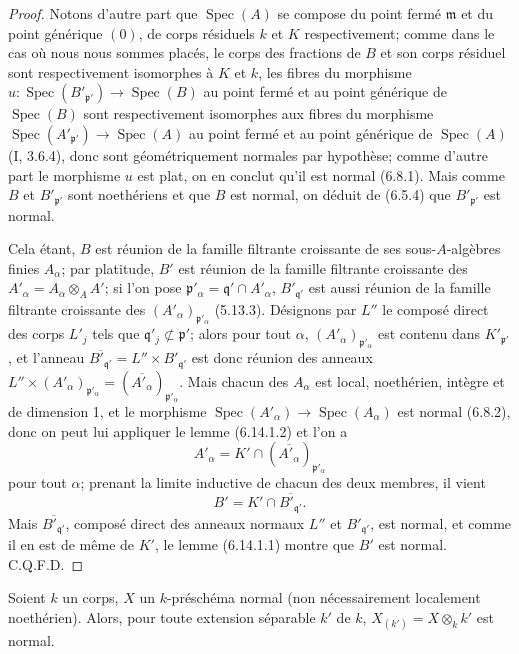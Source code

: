 \begin{proof}
Notons d'autre part que $\operatorname{Spec}(A)$ se compose du point fermé
$\mathfrak m$ et du point générique $(0)$, de corps résiduels $k$ et $K$
respectivement; comme dans le cas où nous nous sommes placés, le corps des
fractions de $B$ et son corps résiduel sont respectivement isomorphes à $K$
et $k$, les fibres du morphisme
$u:\operatorname{Spec}(B'_{\mathfrak p'})\to\operatorname{Spec}(B)$ au
point fermé et au point générique de $\operatorname{Spec}(B)$ sont
respectivement isomorphes aux fibres du morphisme
$\operatorname{Spec}(A'_{\mathfrak p'})\to\operatorname{Spec}(A)$ au point
fermé et au point générique de $\operatorname{Spec}(A)$ (I, 3.6.4), donc
sont géométriquement normales par hypothèse; comme d'autre part le
morphisme $u$ est plat, on en conclut qu'il est normal (6.8.1). Mais comme
$B$ et $B'_{\mathfrak p'}$ sont noethériens et que $B$ est normal, on
déduit de (6.5.4) que $B'_{\mathfrak p'}$ est normal.

Cela étant, $B$ est réunion de la famille filtrante croissante de ses
sous-$A$-algèbres finies $A_\alpha$; par platitude, $B'$ est réunion de la
famille filtrante croissante des
$A'_\alpha=A_\alpha\otimes_A A'$; si l'on pose
$\mathfrak p'_\alpha=\mathfrak q'\cap A'_\alpha$,
$B'_{\mathfrak q'}$ est aussi réunion de la famille filtrante croissante
des $(A'_\alpha)_{\mathfrak p'_\alpha}$ (5.13.3). Désignons par $L''$ le
composé direct des corps $L'_j$ tels que
$\mathfrak q'_j\not\subset\mathfrak p'$; alors pour tout $\alpha$,
$(A'_\alpha)_{\mathfrak p'_\alpha}$ est contenu dans
$K'_{\mathfrak p'}$, et l'anneau
$\overline{B'_{\mathfrak q'}}=L''\times B'_{\mathfrak q'}$ est donc réunion
des anneaux
$L''\times(A'_\alpha)_{\mathfrak p'_\alpha}=
(\overline{A'_\alpha})_{\mathfrak p'_\alpha}$. Mais chacun des $A_\alpha$
est local, noethérien, intègre et de dimension 1, et le morphisme
$\operatorname{Spec}(A'_\alpha)\to\operatorname{Spec}(A_\alpha)$ est
normal (6.8.2), donc on peut lui appliquer le lemme (6.14.1.2) et l'on a
\[
A'_\alpha=K'\cap(\overline{A'_\alpha})_{\mathfrak p'_\alpha}
\]
pour tout $\alpha$; prenant la limite inductive de chacun des deux membres,
il vient
\[
B'=K'\cap\overline{B'_{\mathfrak q'}}.
\]
Mais $\overline{B'_{\mathfrak q'}}$, composé direct des anneaux normaux
$L''$ et $B'_{\mathfrak q'}$, est normal, et comme il en est de même de
$K'$, le lemme (6.14.1.1) montre que $B'$ est normal. C.Q.F.D.
\end{proof}

\begin{corollary}[6.14.2]
\label{IV.2.s6.14.2-fr}
Soient $k$ un corps, $X$ un $k$-préschéma normal (non nécessairement
localement noethérien). Alors, pour toute extension séparable $k'$ de $k$,
$X_{(k')}=X\otimes_k k'$ est normal.
\end{corollary}

